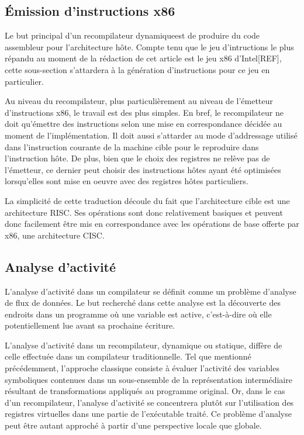 \documentclass{article} %
\begin{document}
\subsection{Émission d'instructions x86}
Le but principal d'un recompilateur dynamiqueest de produire du code assembleur pour l'architecture hôte. Compte tenu que le jeu d'intructions le plus répandu au moment de la rédaction de cet article est le jeu x86 d'Intel[REF], cette sous-section s'attardera à la génération d'instructions pour ce jeu en particulier. 

Au niveau du recompilateur, plus particulièrement au niveau de l'émetteur d'instructions x86, le travail est des plus simples. En bref, le recompilateur ne doit qu'émettre des instructions selon une mise en correspondance décidée au moment de l'implémentation. Il doit aussi s'attarder au mode d'addressage utilisé dans l'instruction courante de la machine cible pour le reproduire dans l'instruction hôte. De plus, bien que le choix des registres ne relève pas de l'émetteur, ce dernier peut choisir des instructions hôtes ayant été optimisées lorsqu'elles sont mise en oeuvre avec des registres hôtes particuliers. 

La simplicité de cette traduction découle du fait que l'architecture cible est une architecture RISC. Ses opérations sont donc relativement basiques et peuvent donc facilement être mis en correspondance avec les opérations de base offerte par x86, une architecture CISC. 

\subsection{Analyse d'activité}
L'analyse d'activité dans un compilateur se définit comme un problème d'analyse de flux de données. Le but recherché dans cette analyse est la découverte des endroits dans un programme où une variable est active, c'est-à-dire où elle potentiellement lue avant sa prochaine écriture.

L'analyse d'activité dans un recompilateur, dynamique ou statique, diffère de celle effectuée dans un compilateur traditionnelle. Tel que mentionné précédemment, l'approche classique consiste à évaluer l'activité des variables symboliques contenues dans un sous-ensemble de la représentation intermédiaire résultant de transformations appliqués au programme original. Or, dans le cas d'un recompilateur, l'analyse d'activité se concentrera plutôt sur l'utilisation des registres virtuelles dans une partie de l'exécutable traité. Ce problème d'analyse peut être autant approché à partir d'une perspective locale que globale.
\end{document}
